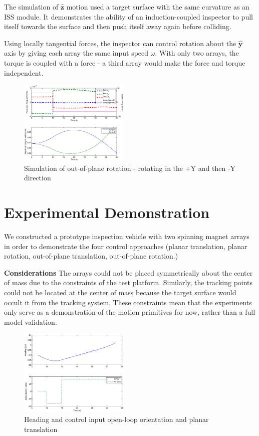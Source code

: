 \documentclass[letterpaper, 10 pt, conference]{ieeeconf}  %
\begin{document}
The simulation of $\hat{\textbf{z}}$ motion used a target surface with the same curvature as an ISS module. It demonstrates the ability of an induction-coupled inspector to pull itself towards the surface and then push itself away again before colliding. 


Using locally tangential forces, the inspector can control rotation about the $\hat{\textbf{y}}$ axis by giving each array the same input speed $\omega$. With only two arrays, the torque is coupled with a force - a third array would make the force and torque independent. 
   

   \begin{figure}[thpb]
      \centering
      \includegraphics[width = 0.47\textwidth]{figures/curve_rotations.eps}
      \caption{Simulation of out-of-plane rotation - rotating in the +Y and then -Y direction}
      \label{fig:ooprotation}
   \end{figure}


\section{Experimental Demonstration}\label{sec:experiments}
We constructed a prototype inspection vehicle with two spinning magnet arrays in order to demonstrate the four control approaches (planar translation, planar rotation, out-of-plane translation, out-of-plane rotation.) 

\textbf{Considerations} The arrays could not be placed symmetrically about the center of mass due to the constraints of the test platform. Similarly, the tracking points could not be located at the center of mass because the target surface would occult it from the tracking system. These constraints mean that the experiments only serve as a demonstration of the motion primitives for now, rather than a full model validation.

  \begin{figure}[thpb]
      \centering
      \includegraphics[width = 0.47\textwidth]{figures/driving_forward_control.eps}
      \caption{Heading and control input open-loop orientation and planar translation}
      \label{fig:planartranslationcontrol}
   \end{figure}
   
\end{document}
